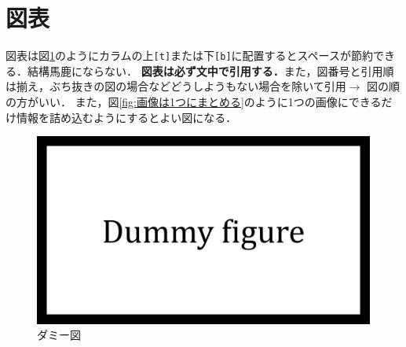 \documentclass[twocolumn, a4paper]{Zemiresume}
\begin{document}
\section{図表}
図表は図\ref{fig:ダミー図}のようにカラムの上\verb|[t]|または下\verb|[b]|に配置するとスペースが節約できる．結構馬鹿にならない．
\textbf{図表は必ず文中で引用する．}また，図番号と引用順は揃え，ぶち抜きの図の場合などどうしようもない場合を除いて引用$\rightarrow$ 図の順の方がいい．
また，図\ref{fig:画像は1つにまとめる}のように1つの画像にできるだけ情報を詰め込むようにするとよい図になる．

\begin{figure}[t]
  \centering
  \includegraphics[width=\columnwidth]{img/Dummy.pdf}
  \caption{ダミー図}\label{fig:ダミー図}
\end{figure}
\end{document}
